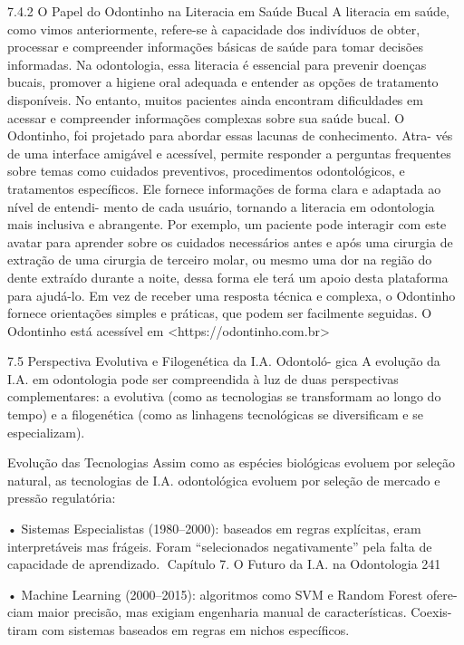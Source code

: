 7.4.2     O Papel do Odontinho na Literacia em Saúde Bucal
A literacia em saúde, como vimos anteriormente, refere-se à capacidade dos indivíduos
de obter, processar e compreender informações básicas de saúde para tomar decisões
informadas. Na odontologia, essa literacia é essencial para prevenir doenças bucais,
promover a higiene oral adequada e entender as opções de tratamento disponíveis. No
entanto, muitos pacientes ainda encontram dificuldades em acessar e compreender
informações complexas sobre sua saúde bucal.
        O Odontinho, foi projetado para abordar essas lacunas de conhecimento. Atra-
vés de uma interface amigável e acessível, permite responder a perguntas frequentes
sobre temas como cuidados preventivos, procedimentos odontológicos, e tratamentos
específicos. Ele fornece informações de forma clara e adaptada ao nível de entendi-
mento de cada usuário, tornando a literacia em odontologia mais inclusiva e abrangente.
         Por exemplo, um paciente pode interagir com este avatar para aprender sobre
os cuidados necessários antes e após uma cirurgia de extração de uma cirurgia de
terceiro molar, ou mesmo uma dor na região do dente extraído durante a noite, dessa
forma ele terá um apoio desta plataforma para ajudá-lo. Em vez de receber uma
resposta técnica e complexa, o Odontinho fornece orientações simples e práticas, que
podem ser facilmente seguidas.
         O Odontinho está acessível em <https://odontinho.com.br>


7.5     Perspectiva Evolutiva e Filogenética da I.A. Odontoló-
        gica
A evolução da I.A. em odontologia pode ser compreendida à luz de duas perspectivas
complementares: a evolutiva (como as tecnologias se transformam ao longo do tempo)
e a filogenética (como as linhagens tecnológicas se diversificam e se especializam).

Evolução das Tecnologias
Assim como as espécies biológicas evoluem por seleção natural, as tecnologias de I.A.
odontológica evoluem por seleção de mercado e pressão regulatória:

    • Sistemas Especialistas (1980–2000): baseados em regras explícitas, eram
      interpretáveis mas frágeis. Foram “selecionados negativamente” pela falta de
      capacidade de aprendizado.
Capítulo 7. O Futuro da I.A. na Odontologia                                           241


    • Machine Learning (2000–2015): algoritmos como SVM e Random Forest ofere-
      ciam maior precisão, mas exigiam engenharia manual de características. Coexis-
      tiram com sistemas baseados em regras em nichos específicos.

